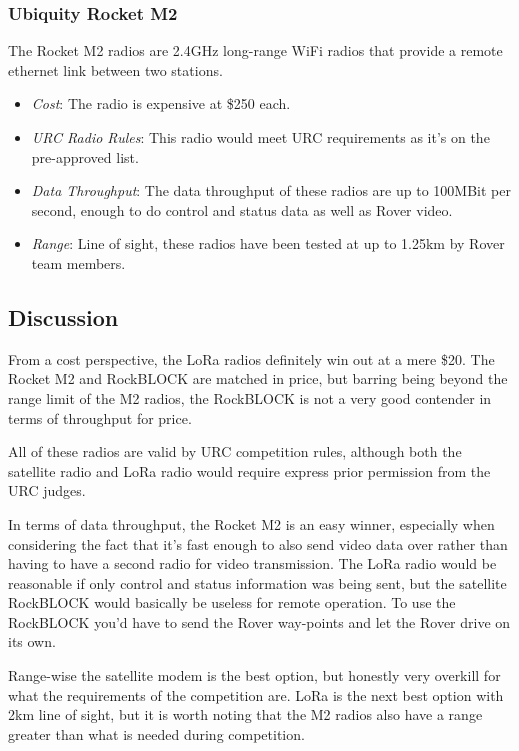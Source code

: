 \documentclass[onecolumn, draftclsnofoot, 10pt, compsoc]{IEEEtran}
\begin{document}
\subsubsection{Ubiquity Rocket M2}
The Rocket M2 radios are 2.4GHz long-range WiFi radios that provide a remote ethernet link between two stations.

\begin{itemize}
\item \textit{Cost}: The radio is expensive at \$250 each.
\item \textit{URC Radio Rules}: This radio would meet URC requirements as it's on the pre-approved list.
\item \textit{Data Throughput}: The data throughput of these radios are up to 100MBit per second, enough to do control and status data as well as Rover video.
\item \textit{Range}: Line of sight, these radios have been tested at up to 1.25km by Rover team members.
\end{itemize}

\subsection{Discussion}
From a cost perspective, the LoRa radios definitely win out at a mere \$20. The Rocket M2 and RockBLOCK are matched in price, but barring being beyond the range limit of the M2 radios, the RockBLOCK is not a very good contender in terms of throughput for price.

All of these radios are valid by URC competition rules, although both the satellite radio and LoRa radio would require express prior permission from the URC judges.

In terms of data throughput, the Rocket M2 is an easy winner, especially when considering the fact that it's fast enough to also send video data over rather than having to have a second radio for video transmission. The LoRa radio would be reasonable if only control and status information was being sent, but the satellite RockBLOCK would basically be useless for remote operation. To use the RockBLOCK you'd have to send the Rover way-points and let the Rover drive on its own.

Range-wise the satellite modem is the best option, but honestly very overkill for what the requirements of the competition are. LoRa is the next best option with 2km line of sight, but it is worth noting that the M2 radios also have a range greater than what is needed during competition.
\end{document}
